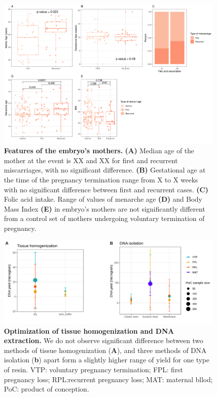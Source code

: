 \begin{figure}[ht]
\centering
\includegraphics[width=\linewidth]{fig/panel_stats.png}
\caption{\textbf{Features of the embryo's mothers.} \textbf{(A)} Median age of the mother at the event is XX and XX for first and recurrent miscarriages, with no significant difference. \textbf{(B)} Gestational age at the time of the pregnancy termination range from X to X weeks with no significant difference between first and recurrent cases.  \textbf{(C)} Folic acid intake. Range of values of menarche age \textbf{(D)} and Body Mass Index \textbf{(E)} in embryo's mothers are not significantly different from a control set of mothers undergoing voluntary termination of pregnancy.}
\label{fig:embryostats}
\end{figure}

\begin{figure}[ht]
    \centering
    \includegraphics[width= 14 cm, high= 16cm]{fig/panelDNA.png}
    \caption{\textbf{Optimization of tissue homogenization and DNA extraction.} We do not observe significant difference between two methods of tissue homogenization (\textbf{A}), and three methods of DNA isolation (\textbf{b}) apart form a slightly higher range of yield for one type of resin. VTP: voluntary pregnancy termination;  FPL: first pregnancy loss; RPL:recurrent pregnancy loss;  MAT: maternal bllod; PoC: product of conception.}
    \label{fig:dna}
\end{figure}

